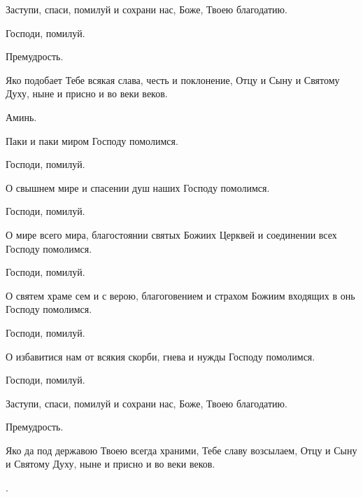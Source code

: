 \begin{mymulticols}



 Заступи, спаси, помилуй и сохрани нас, Боже, Твоею благодатию.

 Господи, помилуй.

 Премудрость.

 Яко подобает Тебе всякая слава, честь и поклонение, Отцу и Сыну и Святому Духу, ныне и присно и во веки веков.

 Аминь.


 Паки и паки миром Господу помолимся.

 Господи, помилуй.

 О свышнем мире и спасении душ наших Господу помолимся. 

 Господи, помилуй.

 О мире всего мира, благостоянии святых Божиих Церквей и соединении всех Господу помолимся. 

 Господи, помилуй.

 О святем храме сем и с верою, благоговением и страхом Божиим входящих в онь Господу помолимся. 

 Господи, помилуй.

 О избавитися нам от всякия скорби, гнева и нужды Господу помолимся. 

 Господи, помилуй.

 Заступи, спаси, помилуй и сохрани нас, Боже, Твоею благодатию. 

 Премудрость. 

 Яко да под державою Твоею всегда храними, Тебе славу возсылаем, Отцу и Сыну и Святому Духу, ныне и присно и во веки веков. 


. 


\end{mymulticols}
